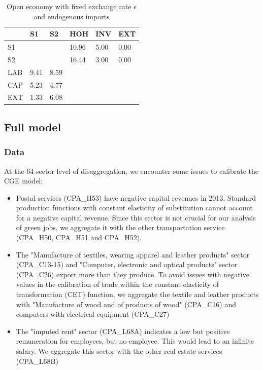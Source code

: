 \begin{table}[!ht]
	\centering
	\caption{Open economy with fixed exchange rate $\epsilon$ and endogenous imports}
	\label{tab:SAM_IO_OpenEconomy_noBudget}
	\begin{tabular}{llllll}
		\toprule
		& S1 & S2 & HOH & INV & EXT \\
		\midrule
		S1 &  &  & 10.96 & 5.00 & 0.00 \\
		S2 &  &  & 16.44 & 3.00 & 0.00 \\
		LAB & 9.41 & 8.59 &  &  &  \\
		CAP & 5.23 & 4.77 &  &  &  \\
		EXT & 1.33 & 6.08 &  &  &  \\
		\bottomrule
	\end{tabular}
\end{table}



\clearpage

\subsection{Full model}
\label{sec:full_model}

\subsubsection{Data}
\label{app:full_model_data}

At the 64-sector level of disaggregation, we encounter some issues to calibrate the CGE model:
\begin{itemize}
	\item Postal services (CPA\_H53) have negative capital revenues in 2013. Standard production functions with constant elasticity of substitution cannot account for a negative capital revenue. 
	Since this sector is not crucial for our analysis of green jobs, we aggregate it with the other transportation service (CPA\_H50, CPA\_H51 and CPA\_H52).
	\item The "Manufacture of textiles, wearing apparel and leather products" sector (CPA\_C13-15) and "Computer, electronic and optical products" sector (CPA\_C26) export more than they produce. To avoid issues with negative values in the calibration of trade within the constant elasticity of transformation (CET) function, we aggregate the textile and leather products with "Manufacture of wood and of products of wood" (CPA\_C16) and computers with electrical equipment (CPA\_C27)
	\item The "imputed rent" sector (CPA\_L68A) indicates a low but positive remuneration for employees, but no employee. This would lead to an infinite salary. We aggregate this sector with the other real estate services (CPA\_L68B)
\end{itemize}




